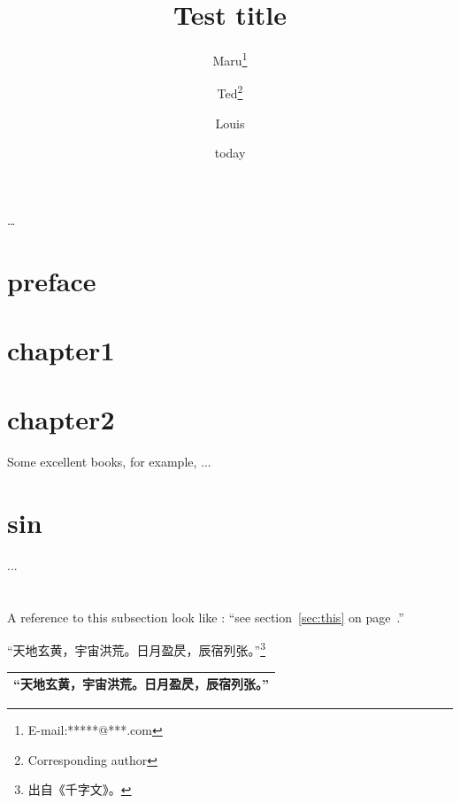 \documentclass{ctexbook}
\title{Test title}
\author{ Maru\thanks{E-mail:*****@***.com}
\and Ted\thanks{Corresponding author}
\and Louis}
\date{today}
\begin{document}
    
\frontmatter%
\maketitle%
\begin{titlepage}
    \dots
\end{titlepage}
\chapter{preface}
\tableofcontents

\mainmatter%
\chapter{chapter1}
\chapter{chapter2}
Some excellent  books, for example, \cite{Alice13}
...

\appendix%
\chapter{sin}
... 

\backmatter%
\chapter{}
\printindex%


A reference to this subsection \label{sec:this}
look like :
``see section~\ref{sec:this} on page~\pageref{sec:this}.''

“天地玄黄，宇宙洪荒。日月盈昃，辰宿列张。”\footnote{出自《千字文》。}

\begin{tabular}{l}
\hline
“天地玄黄，宇宙洪荒。日月盈昃，辰宿列张。”\footnotemark[5] \\
\hline
\end{tabular}


\end{document}
